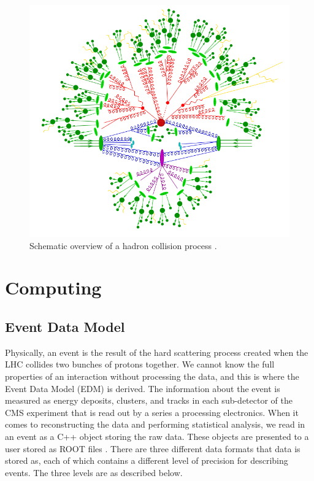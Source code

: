 \begin{figure} [p!] \label{fig-HadronCollisionProcess}
\begin{center}
\includegraphics[scale=0.55]{Figures/HadronCollisionProcess.png}
\caption{Schematic overview of a hadron collision process \cite{HadronCollisionProcess}.}
\end{center}
\end{figure}

\section{Computing}

\subsection{Event Data Model}

Physically, an event is the result of the hard scattering process created when the LHC collides two bunches of protons together. We cannot know the full properties of an interaction without processing the data, and this is where the Event Data Model (EDM) is derived. The information about the event is measured as energy deposits, clusters, and tracks in each sub-detector of the CMS experiment that is read out by a series a processing electronics. When it comes to reconstructing the data and performing statistical analysis, we read in an event as a C++ object storing the raw data. These objects are presented to a user stored as ROOT files \cite{Brun199781}. There are three different data formats that data is stored as, each of which contains a different level of precision for describing events. The three levels are as described below.

